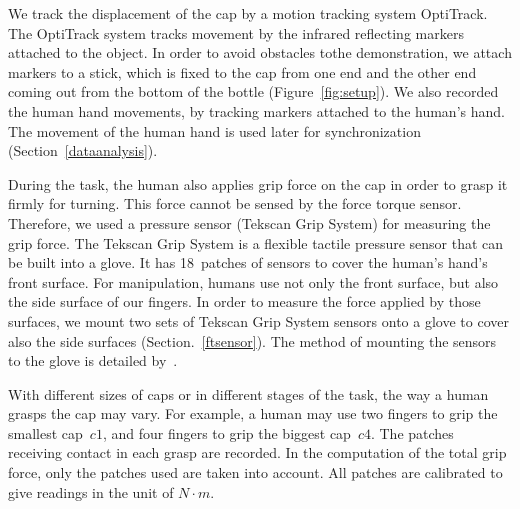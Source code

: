 We track the displacement of the cap by a motion tracking system
OptiTrack. The OptiTrack system tracks movement by the infrared
reflecting markers attached to the object. In order to avoid obstacles
tothe demonstration, we attach markers to a stick, which is fixed to
the cap from one end and the other end coming out from the bottom of
the bottle (Figure~\ref{fig:setup}). We also recorded the human hand
movements, by tracking markers attached to the human's hand. The
movement of the human hand is used later for synchronization
(Section~\ref{dataanalysis}).

During the task, the human also applies grip force on the cap in order
to grasp it firmly for turning. This force cannot be sensed by the
force torque sensor. Therefore, we used a pressure sensor (Tekscan
Grip System) for measuring the grip force. The Tekscan Grip System is
a flexible tactile pressure sensor that can be built into a glove. It
has 18~patches of sensors to cover the human's hand's front
surface. For manipulation, humans use not only the front surface, but
also the side surface of our fingers. In order to measure the force
applied by those surfaces, we mount two sets of Tekscan Grip System
sensors onto a glove to cover also the side surfaces
(Section.~\ref{ftsensor}). The method of mounting the sensors to the glove
is detailed by~\citet{deSouza2014}. 

With different sizes of  caps
or in different stages of the task, the way a human grasps the cap may
vary.  For example, a human may use two fingers to grip the smallest
cap~$c1$, and four fingers to grip the biggest cap~$c4$. The patches
receiving contact in each grasp are recorded. In the computation of
the total grip force, only the patches used are taken into
account. All patches are calibrated to give readings in the unit of
$N{\cdot}m$.


